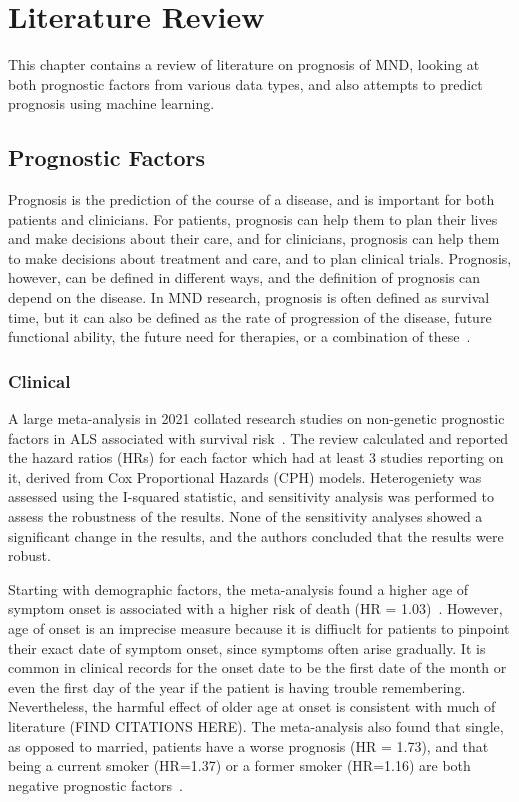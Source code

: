 \chapter{Literature Review}
\label{literature_review}

This chapter contains a review of literature on prognosis of MND, looking at both prognostic factors from various data types, and also attempts to predict prognosis using machine learning.

\section{Prognostic Factors}

Prognosis is the prediction of the course of a disease, and is important for both patients and clinicians.
For patients, prognosis can help them to plan their lives and make decisions about their care, and for clinicians, prognosis can help them to make decisions about treatment and care, and to plan clinical trials.
Prognosis, however, can be defined in different ways, and the definition of prognosis can depend on the disease.
In MND research, prognosis is often defined as survival time, but it can also be defined as the rate of progression of the disease, future functional ability, the future need for therapies, or a combination of these~\cite{papaizMachineLearningSolutions2022, tavazziArtificialIntelligenceStatistical2023}.

\subsection{Clinical}

A large meta-analysis in 2021 collated research studies on non-genetic prognostic factors in ALS associated with survival risk~\cite{suPredictorsSurvivalPatients2021}.
The review calculated and reported the hazard ratios (HRs) for each factor which had at least 3 studies reporting on it, derived from Cox Proportional Hazards (CPH) models.
Heterogeniety was assessed using the I-squared statistic, and sensitivity analysis was performed to assess the robustness of the results.
None of the sensitivity analyses showed a significant change in the results, and the authors concluded that the results were robust.

Starting with demographic factors, the meta-analysis found a higher age of symptom onset is associated with a higher risk of death (HR = 1.03)~\cite{suPredictorsSurvivalPatients2021}. However, age of onset is an imprecise measure because it is diffiuclt for patients to pinpoint their exact date of symptom onset, since symptoms often arise gradually.
It is common in clinical records for the onset date to be the first date of the month or even the first day of the year if the patient is having trouble remembering. Nevertheless, the harmful effect of older age at onset is consistent with much of literature (FIND CITATIONS HERE).
The meta-analysis also found that single, as opposed to married, patients have a worse prognosis (HR = 1.73), and that being a current smoker (HR=1.37) or a former smoker (HR=1.16) are both negative prognostic factors~\cite{suPredictorsSurvivalPatients2021}.

